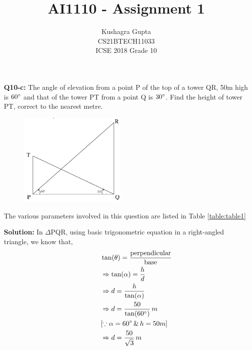 \documentclass[journal,12pt,twocolumn,hidelinks]{IEEEtran}
\begin{document}
\newcommand{\solution}{\noindent \textbf{Solution: }}

\graphicspath{{figures/}}
\title{AI1110 - Assignment 1}

\author{Kushagra Gupta \\ \normalsize CS21BTECH11033  \\ \Large ICSE 2018 Grade 10}
\date{}
\maketitle
\begin{flushleft}
\textbf{Q10-c:}
The angle of elevation from a point P of the top of a tower QR, 50m high is $60\degree$ and that of the
tower PT from a point Q is $30\degree$. Find the height of tower PT, correct to the nearest metre.

\begin{figure}[!ht]
\centering
\includegraphics[width=150pt]{figures/figure.png}
\label{fig:fig-1}
\end{figure}

The various parameters involved in this question are listed in Table \eqref{table:table1}\\

\begin{table}[ht!]
    
    \caption{}
	\label{table:table1}
\end{table}

\solution In $\Delta$PQR, using basic trigonometric equation in a right-angled triangle, we know that,
\begin{align}
&\tan(\theta)=\frac{\text{perpendicular}}{\text{base}}\\
\hspace{30pt}&\Rightarrow\tan(\alpha) = \frac{h}{d} \\
&\Rightarrow d = \frac{h}{\tan(\alpha)} \\
&\Rightarrow d = \frac{50}{\tan(60\degree)}\, m \\
&[\because \alpha = 60\degree \, \& \, h = 50m] \\
&\Rightarrow d = \frac{50}{\sqrt{3}}\, m
\end{align} 


\end{flushleft}
\end{document}
